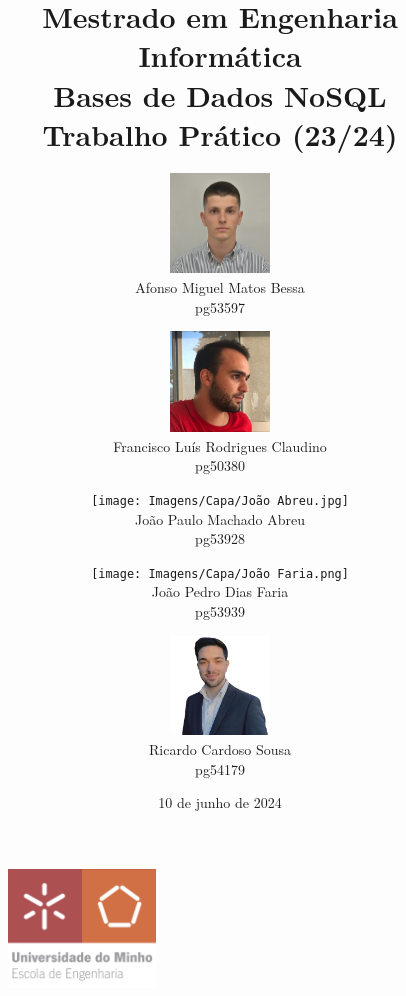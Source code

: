 \title{Mestrado em Engenharia Informática \\ \textbf{Bases de Dados NoSQL} \\ Trabalho Prático (23/24)}

\author{\includegraphics[width=0.2\textwidth]{Imagens/Capa/Afonso.png} \\
            Afonso Miguel Matos Bessa \\ pg53597
        \and
        \includegraphics[width=0.2\textwidth]{Imagens/Capa/Francisco.png} \\
            Francisco Luís Rodrigues Claudino \\ pg50380
        \and
        \texttt{[image: Imagens/Capa/João Abreu.jpg]} \\
            João Paulo Machado Abreu \\ pg53928
        \and
        \texttt{[image: Imagens/Capa/João Faria.png]} \\
            João Pedro Dias Faria \\ pg53939
        \and
        \includegraphics[width=0.2\textwidth]{Imagens/Capa/Ricardo.png} \\
            Ricardo Cardoso Sousa \\ pg54179}

\date{\vspace{\fill} 10 de junho de 2024}


\begin{figure}[t]
    \centering
    \includegraphics[width=0.35\textwidth]{Imagens/Capa/Logo UM.png}
    \vspace{-2.5cm}
\end{figure}

\maketitle
